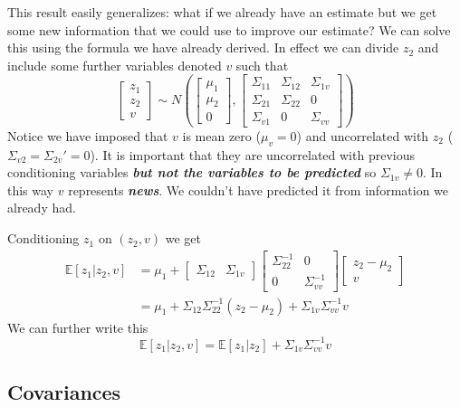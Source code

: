 \documentclass[
  letterpaper,
]{book}
\begin{document}
This result easily generalizes: what if we already have an estimate but
we get some new information that we could use to improve our estimate?
We can solve this using the formula we have already derived. In effect
we can divide \(z_2\) and include some further variables denoted \(v\)
such that \[
\begin{bmatrix}
z_1 \\ 
z_2 \\ 
v
\end{bmatrix}
\sim N\left( 
\begin{bmatrix}
\mu_1 \\ 
\mu_2 \\ 
0
\end{bmatrix},
\begin{bmatrix}
\Sigma_{11} &\Sigma_{12} & \Sigma_{1v} \\ 
\Sigma_{21} &\Sigma_{22} & 0 \\ 
\Sigma_{v1} & 0 & \Sigma_{vv}
\end{bmatrix}
\right)
\] Notice we have imposed that \(v\) is mean zero (\(\mu_v = 0\)) and
uncorrelated with \(z_2\) (\(\Sigma_{v2} = \Sigma_{2v}'=0\)). It is
important that they are uncorrelated with previous conditioning
variables \textbf{\emph{but not the variables to be predicted}} so
\(\Sigma_{1v}\ne 0\). In this way \(v\) represents \textbf{\emph{news}}.
We couldn't have predicted it from information we already had.

Conditioning \(z_1\) on \((z_2,v)\) we get \[
\begin{aligned}
\mathbb{E}[z_1|z_2,v] &= \mu_1 + 
 \begin{bmatrix} \Sigma_{12} & \Sigma_{1v} \end{bmatrix}
 \begin{bmatrix} \Sigma_{22}^{-1} & 0 \\ 0 & \Sigma_{vv}^{-1} \end{bmatrix}
 \begin{bmatrix} z_2-\mu_2 \\  v  \end{bmatrix} \\
             &= \mu_1 +\Sigma_{12}\Sigma_{22}^{-1}(z_2-\mu_2)+\Sigma_{1v}\Sigma_{vv}^{-1}v
\end{aligned}
\] We can further write this \[
 \mathbb{E}[z_1|z_2, v] = \mathbb{E}[z_1|z_2] +\Sigma_{1v} \Sigma_{vv}^{-1}v
\]

\hypertarget{covariances}{%
\subsection{Covariances}\label{covariances}}
\end{document}
